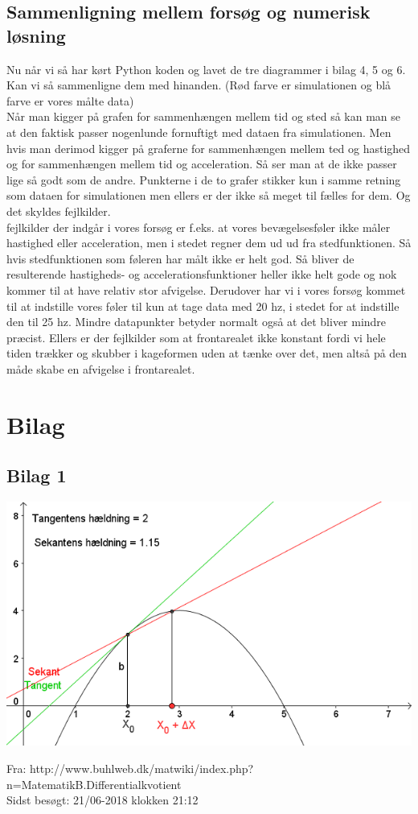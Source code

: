 \documentclass[12pt]{article}
\begin{document}
\subsection{Sammenligning mellem forsøg og numerisk løsning}
Nu når vi så har kørt Python koden og lavet de tre diagrammer i bilag 4, 5 og 6. Kan vi så sammenligne dem med hinanden.
(Rød farve er simulationen og blå farve er vores målte data)\\
Når man kigger på grafen for sammenhængen mellem tid og sted så kan man se at den faktisk passer nogenlunde fornuftigt med dataen fra simulationen.
Men hvis man derimod kigger på graferne for sammenhængen mellem ted og hastighed og for sammenhængen mellem tid og acceleration. Så ser man at de ikke
passer lige så godt som de andre. Punkterne i de to grafer stikker kun i samme retning som dataen for simulationen men ellers er der ikke så meget til fælles for dem.
Og det skyldes fejlkilder.\\
fejlkilder der indgår i vores forsøg er f.eks. at vores bevægelsesføler ikke måler hastighed eller acceleration, men i stedet regner dem ud ud fra stedfunktionen.
Så hvis stedfunktionen som føleren har målt ikke er helt god. Så bliver de resulterende hastigheds- og accelerationsfunktioner heller ikke helt gode og nok kommer til
at have relativ stor afvigelse. Derudover har vi i vores forsøg kommet til at indstille vores føler til kun at tage data med 20 hz, i stedet for at indstille den til
25 hz. Mindre datapunkter betyder normalt også at det bliver mindre præcist. Ellers er der fejlkilder som at frontarealet ikke konstant fordi vi hele tiden trækker og
skubber i kageformen uden at tænke over det, men altså på den måde skabe en afvigelse i frontarealet.


\section{Bilag}
\subsection*{Bilag 1}
\begin{center}
  \includegraphics[width=\linewidth]{tangentogsekant.png}
\end{center}
Fra: http://www.buhlweb.dk/matwiki/index.php?n=MatematikB.Differentialkvotient\\
Sidst besøgt: 21/06-2018 klokken 21:12
\end{document}
